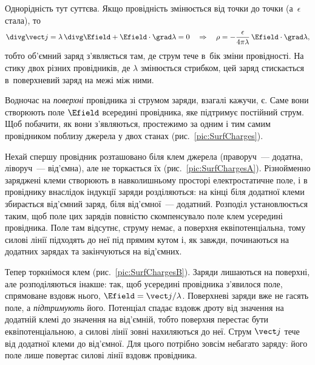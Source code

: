 Однорідність тут суттєва. Якщо провідність змінюється від точки до точки (а~$\epsilon$ стала), то
\begin{equation*}
	\divg\vect j = \lambda\,\divg\Efield + \Efield\cdot\grad\lambda = 0
	\quad\Rightarrow\quad
	\rho = -\frac{\epsilon}{4\pi\lambda}\,\Efield\cdot\grad\lambda,
\end{equation*}
тобто об'ємний заряд з'являється там, де струм тече в~бік зміни провідності. На стику двох різних провідників, де $\lambda$ змінюється
стрибком, цей заряд стискається в~поверхневий заряд на межі між ними.

Водночас на \emph{поверхні} провідника зі струмом заряди, взагалі кажучи, є. Саме вони створюють поле $\Efield$ всередині провідника,
яке підтримує постійний струм. Щоб побачити, як вони з'являються, простежимо за одним і тим самим провідником поблизу джерела у двох станах
(рис.~\ref{pic:SurfCharges}).

Нехай спершу провідник розташовано біля клем джерела (праворуч~--- додатна, ліворуч~--- від'ємна), але не торкається їх
(рис.~\ref{pic:SurfChargesA}). Різнойменно заряджені клеми
створюють в навколишньому просторі електростатичне поле, і в провіднику внаслідок індукції заряди розділяються: на кінці біля додатної
клеми збирається від'ємний заряд, біля від'ємної~--- додатний. Розподіл установлюється таким, щоб поле цих зарядів повністю
скомпенсувало поле клем усередині провідника. Поле там відсутнє, струму немає, а поверхня еквіпотенціальна, тому силові лінії підходять до
неї під прямим кутом і, як завжди, починаються на додатних зарядах та закінчуються на від'ємних.

Тепер торкнімося клем (рис.~\ref{pic:SurfChargesB}). Заряди лишаються на поверхні, але розподіляються інакше: так, щоб усередині
провідника з'явилося поле, спрямоване вздовж нього, $\Efield = \vect j/\lambda$. Поверхневі заряди вже не гасять поле, а \emph{підтримують}
його. Потенціал спадає вздовж дроту від значення на додатній клемі до значення на від'ємній, тобто поверхня перестає бути
еквіпотенціальною, а силові лінії зовні нахиляються до неї. Струм $\vect j$ тече від додатної клеми до від'ємної. Для цього потрібно зовсім небагато заряду: його поле лише повертає силові лінії вздовж провідника.

